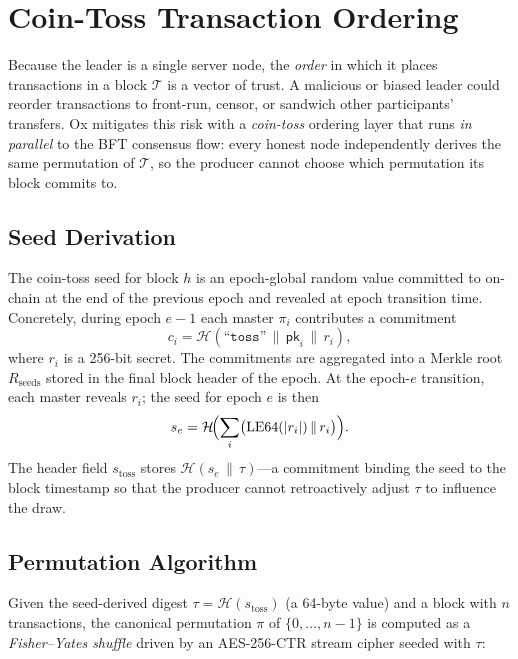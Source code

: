 \documentclass[11pt,a4paper]{article}
\theoremstyle{definition}
\newcommand{\ox}{\textsf{Ox}}
\newcommand{\pk}{\textsf{pk}}
\newcommand{\hash}{\mathcal{H}}
\begin{document}
\section{Coin-Toss Transaction Ordering}
\label{sec:coin-toss}

Because the leader is a single server node, the \emph{order} in which it
places transactions in a block $\mathcal{T}$ is a vector of trust.  A
malicious or biased leader could reorder transactions to front-run,
censor, or sandwich other participants' transfers.  \ox{} mitigates this
risk with a \emph{coin-toss} ordering layer that runs \emph{in parallel} to
the BFT consensus flow: every honest node independently derives the same
permutation of $\mathcal{T}$, so the producer cannot choose which permutation
its block commits to.

\subsection{Seed Derivation}
\label{sec:coin-toss-seed}

The coin-toss seed for block $h$ is an epoch-global random value committed
to on-chain at the end of the previous epoch and revealed at epoch
transition time.  Concretely, during epoch $e-1$ each master $\pi_i$
contributes a commitment
\[
c_i = \hash(\texttt{``toss''}\,\|\,\pk_i\,\|\,r_i),
\]
where $r_i$ is a 256-bit secret.  The commitments are aggregated into a
Merkle root $R_{\mathrm{seeds}}$ stored in the final block header of the
epoch.  At the epoch-$e$ transition, each master reveals $r_i$; the seed
for epoch $e$ is then
\[
s_e = \hash\!\Bigl(\sum_{i} \bigl(\mathrm{LE64}(|r_i|)\,\|\,r_i\bigr)\Bigr).
\]
The header field $s_{\mathrm{toss}}$ stores $\hash(s_e \,\|\, \tau)$---a
commitment binding the seed to the block timestamp so that the producer
cannot retroactively adjust $\tau$ to influence the draw.

\subsection{Permutation Algorithm}
\label{sec:coin-toss-perm}

Given the seed-derived digest $\tau = \hash(s_{\mathrm{toss}})$ (a 64-byte
value) and a block with $n$ transactions, the canonical permutation $\pi$
of $\{0,\dots,n-1\}$ is computed as a \emph{Fisher--Yates shuffle} driven by
an AES-256-CTR stream cipher seeded with $\tau$:
\end{document}
